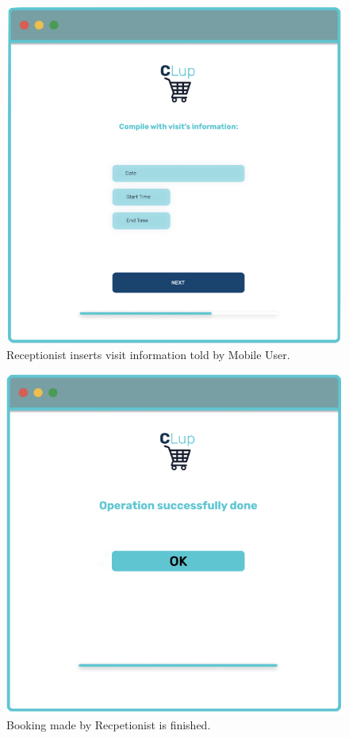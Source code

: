 \begin{figure}[h]
  \caption{Receptionist inserts visit information told by Mobile User.}
  \label{fig:Login}
  \centering
  \includegraphics[scale=0.35]{images/mockup/info_visit_rec.png}

\end{figure}

\begin{figure}[H]
  \caption{Booking made by Recpetionist is finished.}
  \label{fig:Login}
  \centering
  \includegraphics[scale=0.35]{images/mockup/Done_Rec.png}

\end{figure}



